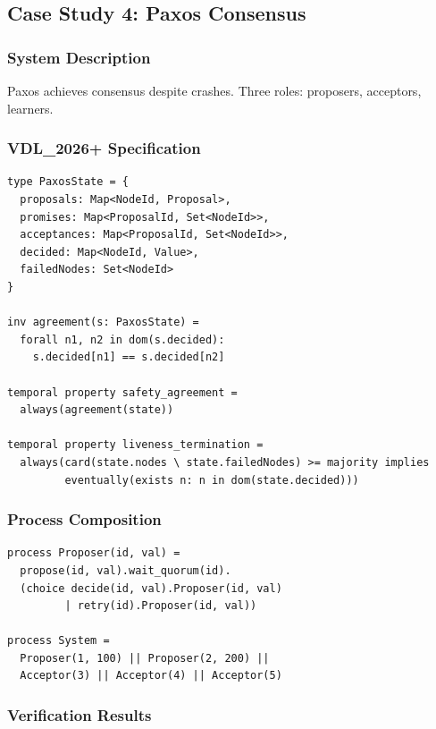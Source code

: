 \documentclass[conference]{IEEEtran}
\begin{document}
\subsection{Case Study 4: Paxos Consensus}

\subsubsection{System Description}

Paxos \cite{lamport1998} achieves consensus despite crashes. Three roles: proposers, acceptors, learners.

\subsubsection{VDL\_2026+ Specification}

\begin{lstlisting}
type PaxosState = {
  proposals: Map<NodeId, Proposal>,
  promises: Map<ProposalId, Set<NodeId>>,
  acceptances: Map<ProposalId, Set<NodeId>>,
  decided: Map<NodeId, Value>,
  failedNodes: Set<NodeId>
}

inv agreement(s: PaxosState) =
  forall n1, n2 in dom(s.decided):
    s.decided[n1] == s.decided[n2]

temporal property safety_agreement =
  always(agreement(state))

temporal property liveness_termination =
  always(card(state.nodes \ state.failedNodes) >= majority implies
         eventually(exists n: n in dom(state.decided)))
\end{lstlisting}

\subsubsection{Process Composition}

\begin{lstlisting}
process Proposer(id, val) =
  propose(id, val).wait_quorum(id).
  (choice decide(id, val).Proposer(id, val)
         | retry(id).Proposer(id, val))

process System = 
  Proposer(1, 100) || Proposer(2, 200) || 
  Acceptor(3) || Acceptor(4) || Acceptor(5)
\end{lstlisting}

\subsubsection{Verification Results}
\end{document}
